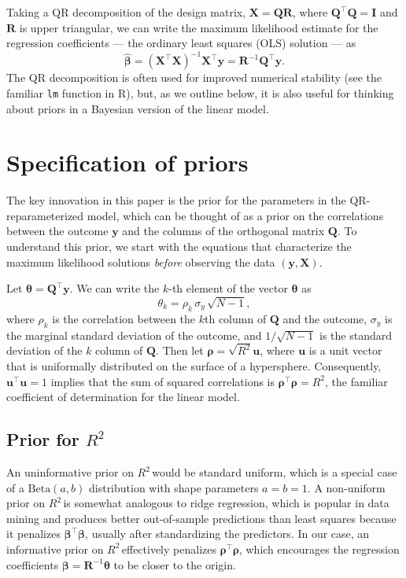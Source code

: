 \documentclass[11pt]{article}
\newcommand{\Rsq}{$R^2\,$}
\newcommand{\boldrho}{\boldsymbol{\rho}}
\newcommand{\boldbeta}{\boldsymbol{\beta}}
\newcommand{\boldtheta}{\boldsymbol{\theta}}
\newcommand{\hatbeta}{\widehat{\boldbeta}}
\newcommand{\X}{\mathbf{X}}
\newcommand{\y}{\mathbf{y}}
\newcommand{\Q}{\mathbf{Q}}
\newcommand{\R}{\mathbf{R}}
\renewcommand{\u}{\mathbf{u}}
\newcommand{\Betadist}[2]{\mathrm{Beta}\left(#1,#2\right)}
\begin{document}
Taking a QR decomposition of the design matrix, $\X = \Q\R$, where $\Q^\top \Q =
\mathbf{I}$ and $\R$ is upper triangular, we can write the maximum likelihood
estimate for the regression coefficients --- the ordinary least squares (OLS)
solution --- as
$$\hatbeta = \left(\X^\top \X \right)^{-1} \X^\top \y = \R^{-1} \Q^\top \y.$$
%
The QR decomposition is often used for improved numerical stability (see the
familiar {\tt lm} function in R), but, as we outline below, it is also useful
for thinking about priors in a Bayesian version of the linear model.


\section{Specification of priors}
\label{sec:priors}

The key innovation in this paper is the prior for the parameters in the
QR-reparameterized model, which can be thought of as a prior on the correlations
between the outcome $\y$ and the columns of the orthogonal matrix $\Q$. To
understand this prior, we start with the equations that characterize the maximum
likelihood solutions \emph{before} observing the data $\left(\y, \X\right)$.

Let $\boldtheta = \Q^\top \y$. We can write the $k$-th element of the vector
$\boldtheta$ as
$$\theta_k = \rho_k \, \sigma_y \, \sqrt{N - 1},$$
where $\rho_k$ is the correlation between the $k$th column of $\Q$ and the
outcome, $\sigma_y$ is the marginal standard deviation of the outcome, and
$1/\sqrt{N-1}$ is the standard deviation of the $k$ column of $\Q$. Then let
$\boldrho = \sqrt{R^2}\u$, where $\u$ is a unit vector that is
uniformally distributed on the surface of a hypersphere. Consequently,
$\u^\top \u = 1$ implies that the sum of squared correlations is
$\boldrho^\top \boldrho = R^2$, the familiar coefficient of determination for
the linear model.

\subsection{Prior for \Rsq}
\label{subsec:r2prior}
An uninformative prior on \Rsq would be standard uniform, which is a special
case of a $\Betadist{a}{b}$ distribution with shape parameters $a = b = 1$.
A non-uniform prior on \Rsq is somewhat analogous to ridge
regression, which is popular in data mining and produces better out-of-sample
predictions than least squares because it penalizes $\boldbeta^\top \boldbeta$,
usually after standardizing the predictors. In our case, an informative prior on
\Rsq effectively penalizes $\boldrho^\top \boldrho$, which encourages the
regression coefficients $\boldbeta = \R^{-1} \boldtheta$ to be closer to the
origin.
\end{document}
